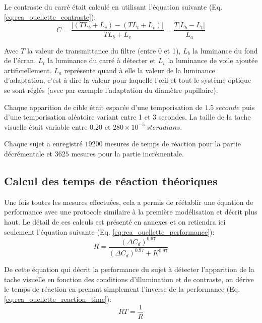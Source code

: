 	\par Le contraste du carré était calculé en utilisant l'équation suivante (Eq. \ref{eq:rea_ouellette_contraste}):
	 \begin{equation}
		C = \frac{\vert (T L_b + L_v) - (T L_t + L_v) \vert}{T L_b + L_v} = \frac{T \vert L_b - L_t \vert}{L_a}
		\label{eq:rea_ouellette_contraste}
	\end{equation}
	
	\par Avec $T$ la valeur de transmittance du filtre (entre 0 et 1), $L_b$ la luminance du fond de l'écran, $L_t$ la luminance du carré à détecter et $L_v$ la luminance de voile ajoutée artificiellement. $L_a$ représente quand à elle la valeur de la luminance d'adaptation, c'est à dire la valeur pour laquelle l'œil et tout le système optique se sont réglés (avec par exemple l'adaptation du diamètre pupillaire).
	
	\par Chaque apparition de cible était espacée d'une temporisation de $1.5~seconde$ puis d'une temporisation aléatoire variant entre 1 et 3 secondes. La taille de la tache visuelle était variable entre $0.20$ et $280 \times 10^{-5}~steradians$.
	
	\par Chaque sujet a enregistré $19200$ mesures de temps de réaction pour la partie décrémentale et $3625$ mesures pour la partie incrémentale.
	
	\subsection{Calcul des temps de réaction théoriques}
	\par Une fois toutes les mesures effectuées, cela a permis de réétablir une équation de performance avec une protocole similaire à la première modélisation et décrit plus haut. Le détail de ces calculs est présenté en annexes et on retiendra ici seulement l'équation suivante (Eq. \ref{eq:rea_ouellette_performance}):
	\begin{equation}
		R = \frac{(\Delta C_d)^{0.97}}{(\Delta C_d)^{0.97} + K^{0.97}}
		\label{eq:rea_ouellette_performance}
	\end{equation}
	
	\par De cette équation qui décrit la performance du sujet à détecter l'apparition de la tache visuelle en fonction des conditions d'illumination et de contraste, on dérive le temps de réaction en prenant simplement l'inverse de la performance (Eq. \ref{eq:rea_ouellette_reaction_time}):
	\begin{equation}
		RT = \frac{1}{R}
		\label{eq:rea_ouellette_reaction_time}
	\end{equation}
	
